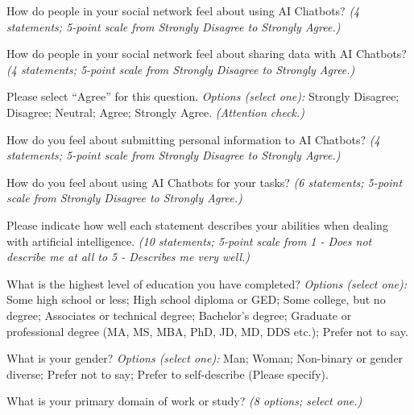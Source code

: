 {
\begin{description}[leftmargin=0pt,itemsep=1pt,font=\normalfont]
\item[\textbf{Q9.1}] How do people in your social network feel about using AI Chatbots? \emph{(4 statements; 5-point scale from Strongly Disagree to Strongly Agree.)}
\item[\textbf{Q9.2}] How do people in your social network feel about sharing data with AI Chatbots? \emph{(4 statements; 5-point scale from Strongly Disagree to Strongly Agree.)}
\item[\textbf{Q9.3}] Please select ``Agree'' for this question. \emph{Options (select one):} Strongly Disagree; Disagree; Neutral; Agree; Strongly Agree. \emph{(Attention check.)}
\item[\textbf{Q9.4}] How do you feel about submitting personal information to AI Chatbots? \emph{(4 statements; 5-point scale from Strongly Disagree to Strongly Agree.)}
\item[\textbf{Q9.5}] How do you feel about using AI Chatbots for your tasks? \emph{(6 statements; 5-point scale from Strongly Disagree to Strongly Agree.)}
\item[\textbf{Q9.6}] Please indicate how well each statement describes your abilities when dealing with artificial intelligence. \emph{(10 statements; 5-point scale from 1 - Does not describe me at all to 5 - Describes me very well.)}
\end{description}

\begin{description}[leftmargin=0pt,itemsep=1pt,font=\normalfont]
\item[\textbf{Q10.1}] What is the highest level of education you have completed? \emph{Options (select one):} Some high school or less; High school diploma or GED; Some college, but no degree; Associates or technical degree; Bachelor's degree; Graduate or professional degree (MA, MS, MBA, PhD, JD, MD, DDS etc.); Prefer not to say.
\item[\textbf{Q10.2}] What is your gender? \emph{Options (select one):} Man; Woman; Non-binary or gender diverse; Prefer not to say; Prefer to self-describe (Please specify).
\item[\textbf{Q10.3}] What is your primary domain of work or study? \emph{(8 options; select one.)}
\end{description}
\par}
